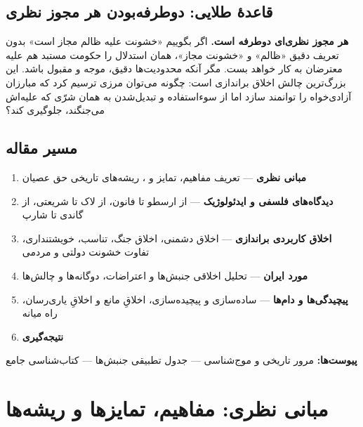 \documentclass[12pt,a4paper]{article}
\newcommand{\lat}[1]{\lr{#1}}
\begin{document}
\subsection*{قاعدهٔ طلایی: دوطرفه‌بودن هر مجوز نظری}

\begin{tcolorbox}[enemybox, title={\textbf{هشدار بنیادین}}]
\textbf{هر مجوز نظری‌ای دوطرفه است.} اگر بگوییم «خشونت علیه ظالم مجاز است» 
بدون تعریف دقیق «ظالم» و «خشونت مجاز»، همان استدلال را حکومت مستبد هم علیه 
معترضان به کار خواهد بست. مگر آنکه محدودیت‌ها دقیق، موجه و مقبول باشد. 
این بزرگ‌ترین چالش اخلاق براندازی است: چگونه می‌توان مرزی ترسیم کرد که 
مبارزان آزادی‌خواه را توانمند سازد اما از سوءاستفاده و تبدیل‌شدن به همان 
شرّی که علیه‌اش می‌جنگند، جلوگیری کند؟
\end{tcolorbox}

\subsection*{مسیر مقاله}

\begin{tcolorbox}[wavebox, title={\textbf{ساختار کلی مقاله}}]
\begin{enumerate}[label=\textbf{بخش \arabic*:}]
\item \textbf{مبانی نظری} — تعریف مفاهیم، تمایز 
\lat{Ethics} و \lat{Morality}، ریشه‌های تاریخی حق عصیان
\item \textbf{دیدگاه‌های فلسفی و ایدئولوژیک} — از ارسطو تا فانون، از لاک تا 
شریعتی، از گاندی تا شارپ
\item \textbf{اخلاق کاربردی براندازی} — اخلاق دشمنی، اخلاق جنگ، تناسب، 
خویشتنداری، تفاوت خشونت دولتی و مردمی
\item \textbf{مورد ایران} — تحلیل اخلاقی جنبش‌ها و اعتراضات، دوگانه‌ها و 
چالش‌ها
\item \textbf{پیچیدگی‌ها و دام‌ها} — ساده‌سازی و پیچیده‌سازی، اخلاقِ مانع و 
اخلاقِ یاری‌رسان، راه میانه
\item \textbf{نتیجه‌گیری}
\end{enumerate}
\textbf{پیوست‌ها:} مرور تاریخی و موج‌شناسی — جدول تطبیقی جنبش‌ها — کتاب‌شناسی جامع
\end{tcolorbox}



\newpage
\section{مبانی نظری: مفاهیم، تمایزها و ریشه‌ها}
\end{document}

